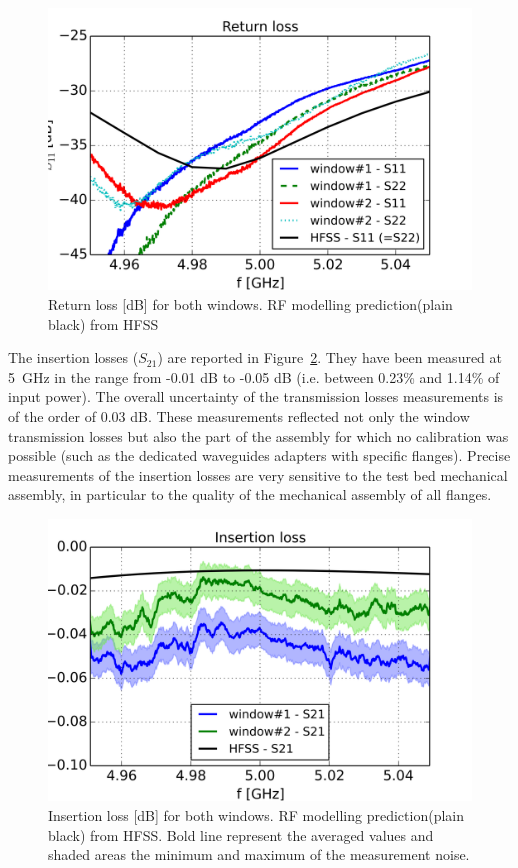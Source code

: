 {\begin{figure}
	\centering
	\includegraphics[width=1.0\linewidth]{figures/chap3/ITER_window/ITER_windows_RL}
	\caption{Return loss [\si{dB}] for both windows. RF modelling prediction(plain black) from HFSS}
	\label{fig:iterwindowsrl}
\end{figure}

The insertion losses ($S_{21}$) are reported in Figure~\ref{fig:iterwindowsil}. They have been measured at 5~GHz in the range from -0.01 dB to -0.05 dB (i.e. between 0.23\% and 1.14\% of input power). The overall uncertainty of the transmission losses measurements is of the order of 0.03 dB. These measurements reflected not only the window transmission losses but also the part of the assembly for which no calibration was possible (such as the dedicated waveguides adapters with specific flanges). Precise measurements of the insertion losses are very sensitive to the test bed mechanical assembly, in particular to the quality of the mechanical assembly of all flanges.  

\begin{figure}
	\centering
	\includegraphics[width=1.0\linewidth]{figures/chap3/ITER_window/ITER_windows_IL}
	\caption{Insertion loss [dB] for both windows. RF modelling prediction(plain black) from HFSS. Bold line represent the averaged values and shaded areas the minimum and maximum of the measurement noise.}
	\label{fig:iterwindowsil}
\end{figure}


}
